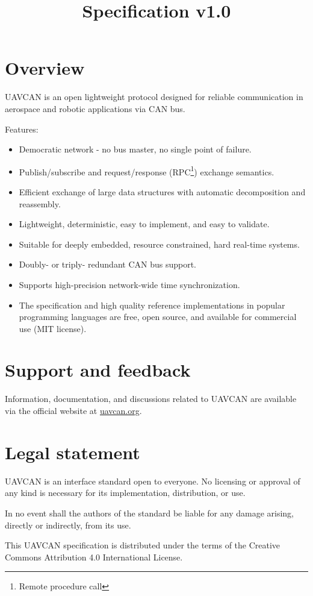\documentclass{uavcandoc}
\title{Specification v1.0}
\begin{document}
\frontmatter

\begin{titlepage}

\section*{Overview}

UAVCAN is an open lightweight protocol designed for reliable communication in aerospace and robotic applications via CAN bus.

Features:

\begin{itemize}
    \item Democratic network - no bus master, no single point of failure.
    \item Publish/subscribe and request/response (RPC\footnote{Remote procedure call}) exchange semantics.
    \item Efficient exchange of large data structures with automatic decomposition and reassembly.
    \item Lightweight, deterministic, easy to implement, and easy to validate.
    \item Suitable for deeply embedded, resource constrained, hard real-time systems.
    \item Doubly- or triply- redundant CAN bus support.
    \item Supports high-precision network-wide time synchronization.
    \item The specification and high quality reference implementations in popular programming languages are free,
    open source, and available for commercial use (MIT license).
\end{itemize}

\BeginRightColumn

\section*{Support and feedback}

Information, documentation, and discussions related to UAVCAN are available via the official website at
\href{http://uavcan.org}{uavcan.org}.

\section*{Legal statement}

UAVCAN is an interface standard open to everyone.
No licensing or approval of any kind is necessary for its implementation, distribution, or use.

In no event shall the authors of the standard be liable for any damage arising, directly or indirectly, from its use.

This UAVCAN specification is distributed under the terms of the Creative Commons Attribution 4.0 International License.

\end{titlepage}
\end{document}
